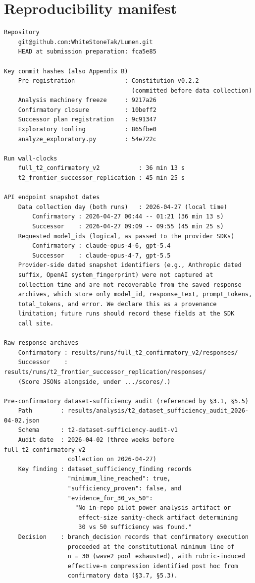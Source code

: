 
\section{Reproducibility manifest}
\label{app:E}

\begin{verbatim}
Repository
    git@github.com:WhiteStoneTak/Lumen.git
    HEAD at submission preparation: fca5e85

Key commit hashes (also Appendix B)
    Pre-registration              : Constitution v0.2.2
                                    (committed before data collection)
    Analysis machinery freeze     : 9217a26
    Confirmatory closure          : 10beff2
    Successor plan registration   : 9c91347
    Exploratory tooling           : 865fbe0
    analyze_exploratory.py        : 54e722c

Run wall-clocks
    full_t2_confirmatory_v2           : 36 min 13 s
    t2_frontier_successor_replication : 45 min 25 s

API endpoint snapshot dates
    Data collection day (both runs)   : 2026-04-27 (local time)
        Confirmatory : 2026-04-27 00:44 -- 01:21 (36 min 13 s)
        Successor    : 2026-04-27 09:09 -- 09:55 (45 min 25 s)
    Requested model_ids (logical, as passed to the provider SDKs)
        Confirmatory : claude-opus-4-6, gpt-5.4
        Successor    : claude-opus-4-7, gpt-5.5
    Provider-side dated snapshot identifiers (e.g., Anthropic dated
    suffix, OpenAI system_fingerprint) were not captured at
    collection time and are not recoverable from the saved response
    archives, which store only model_id, response_text, prompt_tokens,
    total_tokens, and error. We declare this as a provenance
    limitation; future runs should record these fields at the SDK
    call site.

Raw response archives
    Confirmatory : results/runs/full_t2_confirmatory_v2/responses/
    Successor    : results/runs/t2_frontier_successor_replication/responses/
    (Score JSONs alongside, under .../scores/.)

Pre-confirmatory dataset-sufficiency audit (referenced by §3.1, §5.5)
    Path        : results/analysis/t2_dataset_sufficiency_audit_2026-04-02.json
    Schema      : t2-dataset-sufficiency-audit-v1
    Audit date  : 2026-04-02 (three weeks before full_t2_confirmatory_v2
                  collection on 2026-04-27)
    Key finding : dataset_sufficiency_finding records
                  "minimum_line_reached": true,
                  "sufficiency_proven": false, and
                  "evidence_for_30_vs_50":
                    "No in-repo pilot power analysis artifact or
                     effect-size sanity-check artifact determining
                     30 vs 50 sufficiency was found."
    Decision    : branch_decision records that confirmatory execution
                  proceeded at the constitutional minimum line of
                  n = 30 (wave2 pool exhausted), with rubric-induced
                  effective-n compression identified post hoc from
                  confirmatory data (§3.7, §5.3).


\end{verbatim}
